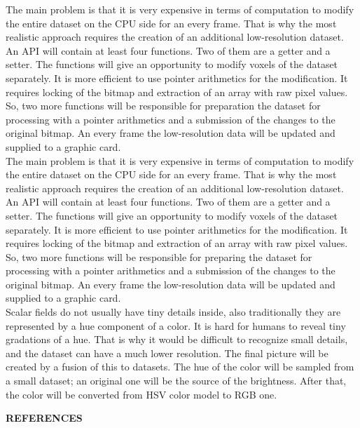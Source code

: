\documentclass[twoside, english, 11pt]{report}
\begin{document}
The main problem is that it is very expensive in terms of computation to modify the entire dataset on the CPU side for an every frame. That is why the most realistic approach requires the creation of an additional low-resolution dataset. An API will contain at least four functions. Two of them are a getter and a setter. The functions will give an opportunity to modify voxels of the dataset separately. It is more efficient to use pointer arithmetics for the modification. It requires locking of the bitmap and extraction of an array with raw pixel values. So, two more functions will be responsible for preparation the dataset for processing with a pointer arithmetics and a submission of the changes to the original bitmap. An every frame the low-resolution data will be updated and supplied to a graphic card. \\

The main problem is that it is very expensive in terms of computation to modify the entire dataset on the CPU side for an every frame. That is why the most realistic approach requires the creation of an additional low-resolution dataset. An API will contain at least four functions. Two of them are a getter and a setter. The functions will give an opportunity to modify voxels of the dataset separately. It is more efficient to use pointer arithmetics for the modification. It requires locking of the bitmap and extraction of an array with raw pixel values. So, two more functions will be responsible for preparing the dataset for processing with a pointer arithmetics and a submission of the changes to the original bitmap. An every frame the low-resolution data will be updated and supplied to a graphic card. \\

Scalar fields do not usually have tiny details inside, also traditionally they are represented by a hue component of a color. It is hard for humans to reveal tiny gradations of a hue. That is why it would be difficult to recognize small details, and the dataset can have a much lower resolution. The final picture will be created by a fusion of this to datasets. The hue of the color will be sampled from a small dataset; an original one will be the source of the brightness. After that, the color will be converted from HSV color model to RGB one.


\newpage

\LARGE \textbf{REFERENCES}\\
\end{document}
